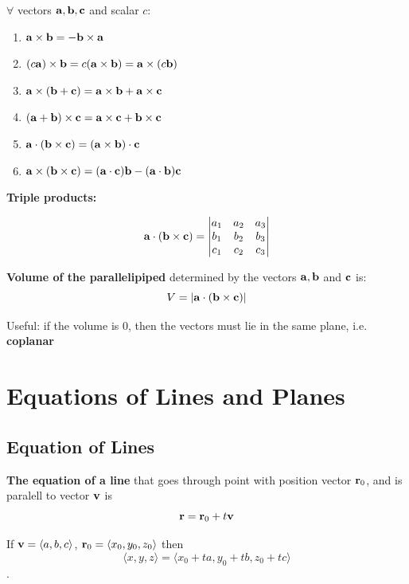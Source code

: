 \documentclass{report}
\begin{document}
\begin{tcolorbox}[colback=red!5!white, colframe=red!75!black, title=Properties of the Cross Product]
$\forall$ vectors $\mathbf{a}, \mathbf{b}, \mathbf{c}$ and scalar $c$:
\begin{enumerate}
    \item $\mathbf{a} \times \mathbf{b} = - \mathbf{b} \times \mathbf{a}$
    \item $(c \mathbf{a}) \times \mathbf{b} = c(\mathbf{a} \times \mathbf{b}) = \mathbf{a} \times (c \mathbf{b})$
    \item $\mathbf{a} \times (\mathbf{b} + \mathbf{c}) = \mathbf{a} \times \mathbf{b} + \mathbf{a} \times \mathbf{c}$
    \item $(\mathbf{a} + \mathbf{b}) \times \mathbf{c} = \mathbf{a} \times \mathbf{c} + \mathbf{b} \times \mathbf{c}$
    \item $\mathbf{a} \cdot (\mathbf{b} \times \mathbf{c}) = (\mathbf{a} \times \mathbf{b}) \cdot \mathbf{c}$
    \item $\mathbf{a} \times (\mathbf{b} \times \mathbf{c}) = (\mathbf{a} \cdot \mathbf{c}) \mathbf{b} - (\mathbf{a} \cdot \mathbf{b}) \mathbf{c}$
\end{enumerate}
\end{tcolorbox}

\textbf{Triple products:}

\[\mathbf{a} \cdot (\mathbf{b} \times \mathbf{c}) = \begin{vmatrix}
    a_1 & a_2 & a_3 \\
    b_1 & b_2 & b_3 \\
    c_1 & c_2 & c_3 \\
\end{vmatrix}\]


\textbf{Volume of the parallelipiped} determined by the vectors $\mathbf{a}, \mathbf{b}$ and $\mathbf{c}$
is:
\[V = |\mathbf{a} \cdot (\mathbf{b} \times \mathbf{c})|\]

Useful: if the volume is 0, then the vectors must lie in the same plane, i.e. \textbf{coplanar}

\section{Equations of Lines and Planes}

\subsection{Equation of Lines}

\textbf{The equation of a line} that goes through point with position vector $\mathbf{r}_0$, 
and is paralell to vector $\mathbf{v}$ is \[
\mathbf{r} = \mathbf{r}_0 + t \mathbf{v}
\]

If $\mathbf{v} = \langle a, b, c\rangle$, $\mathbf{r}_0 = \langle x_0, y_0, z_0 \rangle$ then 
\[
\langle x, y, z\rangle =  \langle x_0 + t a, y_0 + t b, z_0 + t c\rangle
\].
\end{document}
